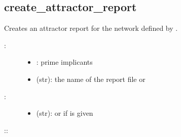 \documentclass[letterpaper,10pt,english]{sphinxmanual}
\begin{document}
\subsection{create\_attractor\_report}
\label{\detokenize{AttractorDetection:id10}}\label{\detokenize{AttractorDetection:create-attractor-report}}

\begin{fulllineitems}
\label{\detokenize{AttractorDetection:PyBoolNet.AttractorDetection.create_attractor_report}}
Creates an attractor report for the network defined by .
\begin{description}
\item[{:}] \leavevmode\begin{itemize}
\item {} 
: prime implicants

\item {} 
 (str): the name of the report file or 

\end{itemize}

\item[{:}] \leavevmode\begin{itemize}
\item {} 
 (str):  or  if  is given

\end{itemize}

\item[{::}] \leavevmode
\begin{sphinxVerbatim}[commandchars=\\\{\}]
 
\end{sphinxVerbatim}

\end{description}

\end{fulllineitems}
\end{document}
